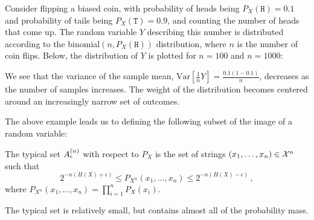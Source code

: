\begin{example}\label{example:biased-coin}
Consider flipping a biased coin, with probability of heads being $P_{X}(\texttt{H}) = 0.1$ and probability of tails being $P_{X}(\texttt{T}) = 0.9$, and counting the number of heads that come up. The random variable $Y$ describing this number is distributed according to the binomial$(n,P_{X}(\texttt{H}))$ distribution, where $n$ is the number of coin flips. Below, the distribution of $Y$ is plotted for $n = 100$ and $n = 1000$:
\begin{center}
\end{center}
We see that the variance of the sample mean, $\mbox{Var}[\frac{1}{n}Y] = \frac{0.1(1-0.1)}{n}$, decreases as the number of samples increases. The weight of the distribution becomes centered around an increasingly narrow set of outcomes.
\end{example}
The above example leads us to defining the following subset of the image of a random variable:

\begin{definition}\label{def:typset}
The typical set $A_{\epsilon}^{(n)}$ with respect to $P_X$ is the set of strings $(x_1, \ldots, x_n) \in {\cal X}^n$ such that
\[
2^{-n (H(X) + \epsilon)} \leq P_{X^n}(x_1, \ldots, x_n) \leq 2^{-n(H(X) - \epsilon)} \, ,
\]
where $P_{X^n}(x_1, \ldots, x_n) = \prod_{i=1}^n P_X(x_i)$.
\end{definition}
The typical set is relatively small, but contains almost all of the probability mass.

